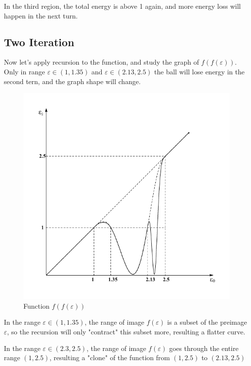 \documentclass[]{article}
\begin{document}
In the third region, the total energy is above 1 again, and more energy loss will happen in the next turn.

\subsection{Two Iteration}

Now let's apply recursion to the function, and study the graph of $f(f(\varepsilon))$. Only in range $\varepsilon \in (1, 1.35)$ and $\varepsilon \in (2.13, 2.5)$ the ball will lose energy in the second tern, and the graph shape will change. 

\begin{figure}[!h]
	\centering
	\includegraphics[scale=1]{f2.pdf}
	\caption{Function $f(f(\varepsilon))$}
	\label{fig:f2}
\end{figure}

In the range $\varepsilon \in (1, 1.35)$, the range of image $f(\varepsilon)$ is a subset of the preimage $\varepsilon$, so the recursion will only "contract" this subset more, resulting a flatter curve.

In the range  $\varepsilon \in (2.3, 2.5)$, the range of image $f(\varepsilon)$ goes through the entire range $(1, 2.5)$, resulting a "clone" of the function from $(1, 2.5)$ to $(2.13, 2.5)$
\end{document}
